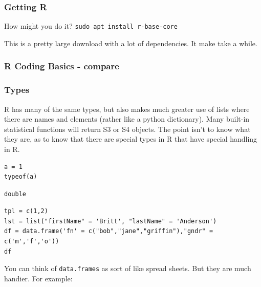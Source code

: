 \documentclass{article}
\begin{document}
\subsubsection{Getting R}
\label{sec:orgdd9e146}
How might you do it?
\texttt{sudo apt install r-base-core}

This is a pretty large download with a lot of dependencies. It make take a while. 
\subsubsection{R Coding Basics - compare}
\label{sec:org72d3586}
\subsubsection{Types}
\label{sec:orge8c3701}
R has many of the same types, but also makes much greater use of lists where there are names and elements (rather like a python dictionary). Many built-in statistical functions will return S3 or S4 objects. The point isn't to know what they are, as to know that there are special types in R that have special handling in R.

\begin{verbatim}
a = 1
typeof(a)
\end{verbatim}

\begin{verbatim}
double
\end{verbatim}

\begin{verbatim}
tpl = c(1,2)
lst = list("firstName" = 'Britt', "lastName" = 'Anderson')
df = data.frame('fn' = c("bob","jane","griffin"),"gndr" = c('m','f','o'))
df
\end{verbatim}


You can think of \texttt{data.frames} as sort of like spread sheets. But they are much handier. For example:
\end{document}

